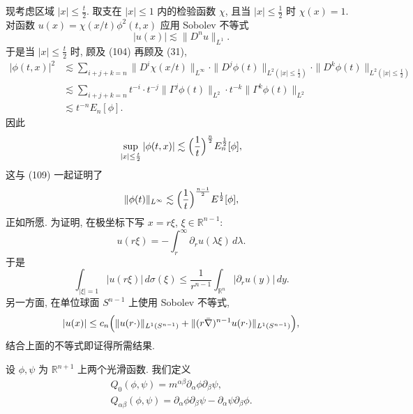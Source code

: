 现考虑区域 $|x|\leq\frac t2$. 取支在 $|x|\leq 1$ 内的检验函数 $\chi$, 且当 $|x|\leq\frac12$ 时 $\chi(x)=1$. 对函数 $u(x)=\chi(x/t)\phi^2(t,x)$ 应用 Sobolev 不等式
\begin{equation}
|u(x)|\lesssim\|D^n u\|_{L^1}.\end{equation}
于是当 $|x|\leq\frac t2$ 时, 顾及 (104) 再顾及 (31),
\begin{align*}
|\phi(t,x)|^2&\lesssim\sum_{i+j+k=n}\|D^i\chi(x/t)\|_{L^\infty}\cdot\|D^j\phi(t)\|_{L^2(|x|\leq\frac t2)}\cdot\|D^k\phi(t)\|_{L^2(|x|\leq\frac t2)}\\
&\lesssim\sum_{i+j+k=n}t^{-i}\cdot t^{-j}\|\Gamma^j\phi(t)\|_{L^2}\cdot t^{-k}\|\Gamma^k\phi(t)\|_{L^2}\\
&\lesssim t^{-n}E_n[\phi].\end{align*}
因此
\begin{equation}
\sup_{|x|\leq\frac t2}|\phi(t,x)|\lesssim\Bigl(\frac1t\Bigr)^{\frac n2}E_n^{\frac12}[\phi],\end{equation}
这与 (109) 一起证明了
\begin{equation}
\|\phi(t)\|_{L^\infty}\lesssim\Bigl(\frac1t\Bigr)^{\frac{n-1}{2}}E^{\frac12}[\phi],\end{equation}
正如所愿.
为证明, 在极坐标下写 $x=r\xi$, $\xi\in\mathbb{R}^{n-1}$:
\begin{equation}
u(r\xi)=-\int_r^\infty\partial_r u(\lambda\xi)\,d\lambda.\end{equation}
于是
\begin{equation}
\int_{|\xi|=1}|u(r\xi)|\,d\sigma(\xi)\leq\frac1{r^{n-1}}\int_{\mathbb{R}^n}|\partial_r u(y)|\,dy.\end{equation}
另一方面, 在单位球面 $S^{n-1}$ 上使用 Sobolev 不等式,
\begin{equation}
|u(x)|\leq c_n\Bigl(\|u(r\cdot)\|_{L^1(S^{n-1})}+\|(r\bar\nabla)^{n-1}u(r\cdot)\|_{L^1(S^{n-1})}\Bigr),\end{equation}
结合上面的不等式即证得所需结果.
\begin{definition}\label{def:4.17}
设 $\phi,\psi$ 为 $\mathbb{R}^{n+1}$ 上两个光滑函数. 我们定义
\begin{gather}
Q_0(\phi,\psi)=m^{\alpha\beta}\partial_\alpha\phi\partial_\beta\psi,\\
Q_{\alpha\beta}(\phi,\psi)=\partial_\alpha\phi\partial_\beta\psi-\partial_\alpha\psi\partial_\beta\phi.\end{gather}
\end{definition}

